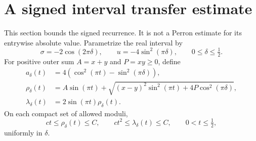 \documentclass[11pt]{article}
\numberwithin{equation}{section}
\theoremstyle{remark}\newtheorem{remark}[theorem]{Remark}
\begin{document}
\section{A signed interval transfer estimate}\label{lc:transfer}
This section bounds the signed recurrence. It is not a Perron estimate
for its entrywise absolute value. Parametrize the real interval by
\[
 \sigma=-2\cos(2\pi\delta),\qquad u=-4\sin^2(\pi\delta),
                    \qquad0\le\delta\le\tfrac12.
\]
For positive outer sum \(A=x+y\) and \(P=xy\ge0\), define
\begin{equation}\label{lc:continuous-coefficients}
\begin{aligned}
 a_\delta(t)&=4(\cos^2(\pi t)-\sin^2(\pi\delta)),\\
 \rho_\delta(t)&=A\sin(\pi t)+
   \sqrt{(x-y)^2\sin^2(\pi t)+4P\cos^2(\pi\delta)},\\
 \lambda_\delta(t)&=2\sin(\pi t)\rho_\delta(t).
\end{aligned}
\end{equation}
On each compact set of allowed moduli,
\begin{equation}\label{lc:endpoint-size}
 ct\le\rho_\delta(t)\le C,\qquad ct^2\le\lambda_\delta(t)\le C,
                          \qquad0<t\le\tfrac12,
\end{equation}
uniformly in \(\delta\).
\end{document}
